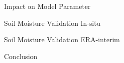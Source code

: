 \documentclass[10pt,ignorenonframetext,xcolor={dvipsnames, table}]{beamer}
\begin{document}
\begin{frame}{Impact on Model Parameter}

\end{frame}

\begin{frame}{Soil Moisture Validation In-situ}

\end{frame}

\begin{frame}{Soil Moisture Validation ERA-interim}

\end{frame}

\begin{frame}{Conclusion}

\end{frame}
\end{document}
